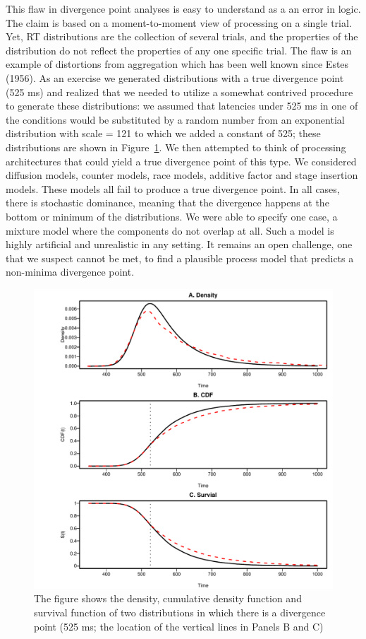 \documentclass[man]{apa}%
\begin{document}
This flaw in divergence point analyses is easy to understand as a an error in logic.  The claim is based on a moment-to-moment view of processing on a single trial.  Yet, RT distributions are the collection of several trials, and the properties of the distribution do not reflect the properties of any one specific trial.  The flaw is an example of distortions from aggregation which has been well known since Estes (1956).   As an exercise we generated distributions with a true divergence point (525 ms) and realized that we needed to utilize a somewhat contrived procedure to generate these distributions: we assumed that latencies under 525 ms in one of the conditions would be substituted by a random number from an exponential distribution with scale = 121 to which we added a constant of 525; these distributions are shown in Figure~\ref{fig:contrived}. We then attempted to think of processing architectures that could yield a true divergence point of this type.  We considered diffusion models, counter models, race models, additive factor and stage insertion models.  These models all fail to produce a true divergence point.  In all cases, there is stochastic dominance, meaning that the divergence happens at the bottom or minimum of the distributions.  We were able to specify one case, a mixture model where the components do not overlap at all.  Such a model is highly artificial and unrealistic in any setting.  It remains an open challenge, one that we suspect cannot be met, to find a plausible process model that predicts a non-minima divergence point.

\begin{figure}[h] %
	\includegraphics[width=5in]{contrived.pdf}
	\caption{The figure shows the density, cumulative density function and survival function of two distributions in which there is a divergence point (525 ms; the location of the vertical lines in Panels B and C)}
		\label{fig:contrived}
\end{figure}
  
\end{document}
